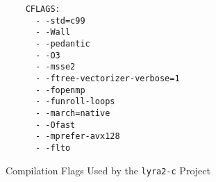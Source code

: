 \begin{figure}
    \begin{verbatim}
    CFLAGS:
      - -std=c99
      - -Wall
      - -pedantic
      - -O3
      - -msse2
      - -ftree-vectorizer-verbose=1
      - -fopenmp
      - -funroll-loops
      - -march=native
      - -Ofast
      - -mprefer-avx128
      - -flto
      \end{verbatim}
      \caption{Compilation Flags Used by the \texttt{lyra2-c} Project}
      \label{fig:compile-flags}
  \end{figure}
